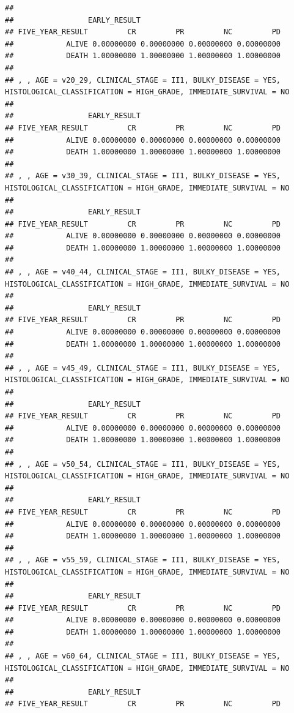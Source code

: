 \documentclass[]{article}
\begin{document}
\begin{verbatim}
## 
##                 EARLY_RESULT
## FIVE_YEAR_RESULT         CR         PR         NC         PD
##            ALIVE 0.00000000 0.00000000 0.00000000 0.00000000
##            DEATH 1.00000000 1.00000000 1.00000000 1.00000000
## 
## , , AGE = v20_29, CLINICAL_STAGE = II1, BULKY_DISEASE = YES, HISTOLOGICAL_CLASSIFICATION = HIGH_GRADE, IMMEDIATE_SURVIVAL = NO
## 
##                 EARLY_RESULT
## FIVE_YEAR_RESULT         CR         PR         NC         PD
##            ALIVE 0.00000000 0.00000000 0.00000000 0.00000000
##            DEATH 1.00000000 1.00000000 1.00000000 1.00000000
## 
## , , AGE = v30_39, CLINICAL_STAGE = II1, BULKY_DISEASE = YES, HISTOLOGICAL_CLASSIFICATION = HIGH_GRADE, IMMEDIATE_SURVIVAL = NO
## 
##                 EARLY_RESULT
## FIVE_YEAR_RESULT         CR         PR         NC         PD
##            ALIVE 0.00000000 0.00000000 0.00000000 0.00000000
##            DEATH 1.00000000 1.00000000 1.00000000 1.00000000
## 
## , , AGE = v40_44, CLINICAL_STAGE = II1, BULKY_DISEASE = YES, HISTOLOGICAL_CLASSIFICATION = HIGH_GRADE, IMMEDIATE_SURVIVAL = NO
## 
##                 EARLY_RESULT
## FIVE_YEAR_RESULT         CR         PR         NC         PD
##            ALIVE 0.00000000 0.00000000 0.00000000 0.00000000
##            DEATH 1.00000000 1.00000000 1.00000000 1.00000000
## 
## , , AGE = v45_49, CLINICAL_STAGE = II1, BULKY_DISEASE = YES, HISTOLOGICAL_CLASSIFICATION = HIGH_GRADE, IMMEDIATE_SURVIVAL = NO
## 
##                 EARLY_RESULT
## FIVE_YEAR_RESULT         CR         PR         NC         PD
##            ALIVE 0.00000000 0.00000000 0.00000000 0.00000000
##            DEATH 1.00000000 1.00000000 1.00000000 1.00000000
## 
## , , AGE = v50_54, CLINICAL_STAGE = II1, BULKY_DISEASE = YES, HISTOLOGICAL_CLASSIFICATION = HIGH_GRADE, IMMEDIATE_SURVIVAL = NO
## 
##                 EARLY_RESULT
## FIVE_YEAR_RESULT         CR         PR         NC         PD
##            ALIVE 0.00000000 0.00000000 0.00000000 0.00000000
##            DEATH 1.00000000 1.00000000 1.00000000 1.00000000
## 
## , , AGE = v55_59, CLINICAL_STAGE = II1, BULKY_DISEASE = YES, HISTOLOGICAL_CLASSIFICATION = HIGH_GRADE, IMMEDIATE_SURVIVAL = NO
## 
##                 EARLY_RESULT
## FIVE_YEAR_RESULT         CR         PR         NC         PD
##            ALIVE 0.00000000 0.00000000 0.00000000 0.00000000
##            DEATH 1.00000000 1.00000000 1.00000000 1.00000000
## 
## , , AGE = v60_64, CLINICAL_STAGE = II1, BULKY_DISEASE = YES, HISTOLOGICAL_CLASSIFICATION = HIGH_GRADE, IMMEDIATE_SURVIVAL = NO
## 
##                 EARLY_RESULT
## FIVE_YEAR_RESULT         CR         PR         NC         PD

\end{verbatim}
\end{document}

